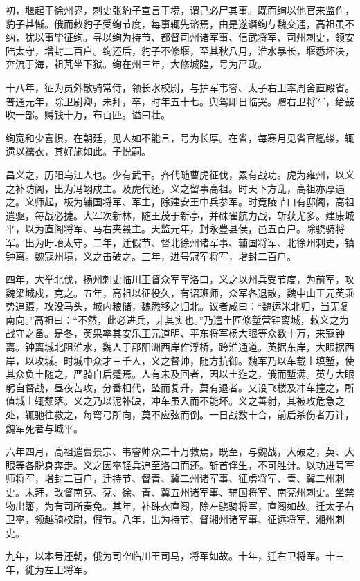 \documentclass[12pt,UTF8]{ctexbook}
\begin{document}
初，堰起于徐州界，刺史张豹子宣言于境，谓己必尸其事。既而绚以他官来监作，豹子甚惭。俄而敕豹子受绚节度，每事辄先谘焉，由是遂谮绚与魏交通，高祖虽不纳，犹以事毕征绚。寻以绚为持节、都督司州诸军事、信武将军、司州刺史，领安陆太守，增封二百户。绚还后，豹子不修堰，至其秋八月，淮水暴长，堰悉坏决，奔流于海，祖芃坐下狱。绚在州三年，大修城隍，号为严政。

十八年，征为员外散骑常侍，领长水校尉，与护军韦睿、太子右卫率周舍直殿省。普通元年，除卫尉卿，未拜，卒，时年五十七。舆驾即日临哭。赠右卫将军，给鼓吹一部。赙钱十万，布百匹。谥曰壮。

绚宽和少喜惧，在朝廷，见人如不能言，号为长厚。在省，每寒月见省官繿缕，辄遗以襦衣，其好施如此。子悦嗣。

昌义之，历阳乌江人也。少有武干。齐代随曹虎征伐，累有战功。虎为雍州，以义之补防阁，出为冯翊戍主。及虎代还，义之留事高祖。时天下方乱，高祖亦厚遇之。义师起，板为辅国将军、军主，除建安王中兵参军。时竟陵芊口有邸阁，高祖遣驱，每战必捷。大军次新林，随王茂于新亭，并硃雀航力战，斩获尤多。建康城平，以为直阁将军、马右夹毂主。天监元年，封永豊县侯，邑五百户。除骁骑将军。出为盱眙太守。二年，迁假节、督北徐州诸军事、辅国将军、北徐州刺史，镇钟离。魏寇州境，义之击破之。三年，进号冠军将军，增封二百户。

四年，大举北伐，扬州刺史临川王督众军军洛口，义之以州兵受节度，为前军，攻魏梁城戍，克之。五年，高祖以征役久，有诏班师，众军各退散，魏中山王元英乘势追蹑，攻没马头，城内粮储，魏悉移之归北。议者咸曰：“魏运米北归，当无复南向。”高祖曰：“不然，此必进兵，非其实也。”乃遣土匠修堑营钟离城，敕义之为战守之备。是冬，英果率其安乐王元道明、平东将军杨大眼等众数十万，来寇钟离。钟离城北阻淮水，魏人于邵阳洲西岸作浮桥，跨淮通道。英据东岸，大眼据西岸，以攻城。时城中众才三千人，义之督帅，随方抗御。魏军乃以车载土填堑，使其众负土随之，严骑自后蹙焉。人有未及回者，因以土迮之，俄而堑满。英与大眼躬自督战，昼夜苦攻，分番相代，坠而复升，莫有退者。又设飞楼及冲车撞之，所值城土辄颓落。义之乃以泥补缺，冲车虽入而不能坏。义之善射，其被攻危急之处，辄驰往救之，每弯弓所向，莫不应弦而倒。一日战数十合，前后杀伤者万计，魏军死者与城平。

六年四月，高祖遣曹景宗、韦睿帅众二十万救焉，既至，与魏战，大破之，英、大眼等各脱身奔走。义之因率轻兵追至洛口而还。斩首俘生，不可胜计。以功进号军师将军，增封二百户，迁持节、督青、冀二州诸军事、征虏将军、青、冀二州刺史。未拜，改督南兗、兗、徐、青、冀五州诸军事、辅国将军、南兗州刺史。坐禁物出籓，为有司所奏免。其年，补硃衣直阁，除左骁骑将军，直阁如故。迁太子右卫率，领越骑校尉，假节。八年，出为持节、督湘州诸军事、征远将军、湘州刺史。

九年，以本号还朝，俄为司空临川王司马，将军如故。十年，迁右卫将军。十三年，徙为左卫将军。
\end{document}
